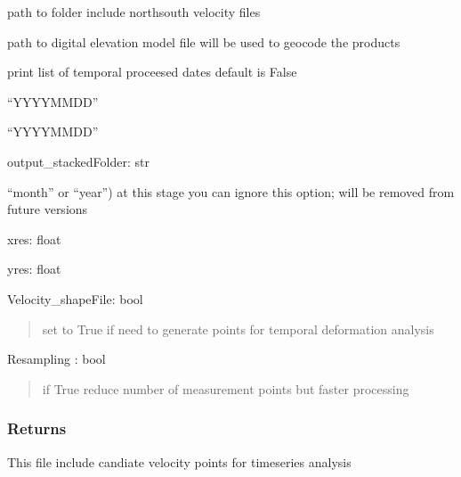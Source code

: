 \documentclass[letterpaper,10pt]{sphinxmanual}
\begin{document}
\begin{fulllineitems}
\begin{description}
\sphinxAtStartPar
path to folder include north\sphinxhyphen{}south velocity files

\sphinxAtStartPar
path to digital elevation model file will be used to geocode the products

\sphinxAtStartPar
print list of temporal proceesed dates default is False

\sphinxAtStartPar
“YYYYMMDD”

\sphinxAtStartPar
“YYYYMMDD”

\end{description}

\sphinxAtStartPar
output\_stackedFolder: str
\begin{description}
\sphinxAtStartPar
“month” or “year”) at this stage you can ignore this option; will be removed from future versions

\end{description}

\sphinxAtStartPar
xres: float

\sphinxAtStartPar
yres: float

\sphinxAtStartPar
Velocity\_shapeFile: bool
\begin{quote}

\sphinxAtStartPar
set to True if need to generate points for temporal deformation analysis
\end{quote}

\sphinxAtStartPar
Resampling : bool
\begin{quote}

\sphinxAtStartPar
if True reduce number of measurement points but faster processing
\end{quote}


\subsubsection{Returns}
\label{\detokenize{generated/akhdefo_functions.stackprep:returns}}\begin{description}
\sphinxAtStartPar
This file include candiate velocity points for timeseries analysis

\end{description}

\end{fulllineitems}
\end{document}
